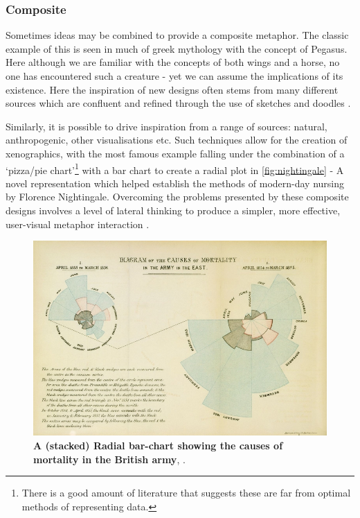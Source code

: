 \subsubsection{Composite}


Sometimes ideas may be combined to provide a composite metaphor. The classic example of this is seen in much of greek mythology with the concept of Pegasus. Here although we are familiar with the concepts of both wings and a horse, no one has encountered such a creature - yet we can assume the implications of its existence.
Here the inspiration of new designs often stems from many different sources which are confluent and refined through the use of sketches and doodles \citep{fds}.

Similarly, it is possible to drive inspiration from a range of sources: natural, anthropogenic, other visualisations etc.
Such techniques allow for the creation of xenographics, with the most famous example falling under the combination of a `pizza/pie chart'\footnote{There is a good amount of literature that suggests these are far from optimal methods of representing data. } with a bar chart to create a radial plot in \autoref{fig:nightingale} - A novel representation which helped establish the methods of modern-day nursing by Florence Nightingale.
Overcoming the problems presented by these composite designs involves a level of lateral thinking to produce a simpler, more effective, user-visual metaphor interaction \citep{shapinginfo}.



\begin{figure}[H]
     \centering
         \includegraphics[width=.75\textwidth]{figures_c1/nightingale.jpg}
        \caption[Caption for LOF]{\textbf{A (stacked) Radial bar-chart showing the causes of mortality in the British army}\protect\footnotemark , \citep{nightingale}.}
        \label{fig:nightingale}
\end{figure}




